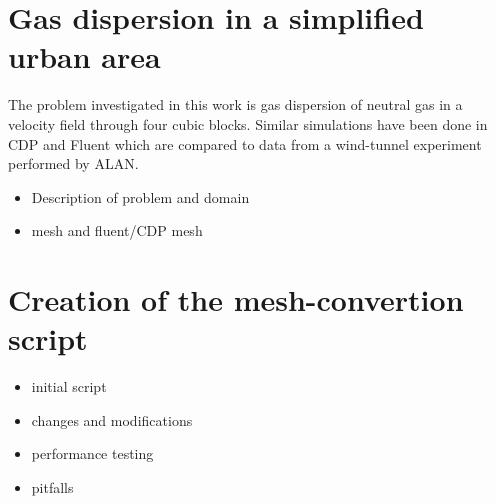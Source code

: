 \section{Gas dispersion in a simplified urban area}
The problem investigated in this work is gas dispersion of neutral gas in a velocity field through four cubic blocks.
Similar simulations have been done in CDP and Fluent which are compared to data from a wind-tunnel experiment performed by ALAN.
\begin{itemize}
	\item Description of problem and domain
	\item mesh and fluent/CDP mesh
\end{itemize}

\section{Creation of the mesh-convertion script}

\begin{itemize}
	\item initial script
	\item changes and modifications
	\item performance testing
	\item pitfalls
\end{itemize}

